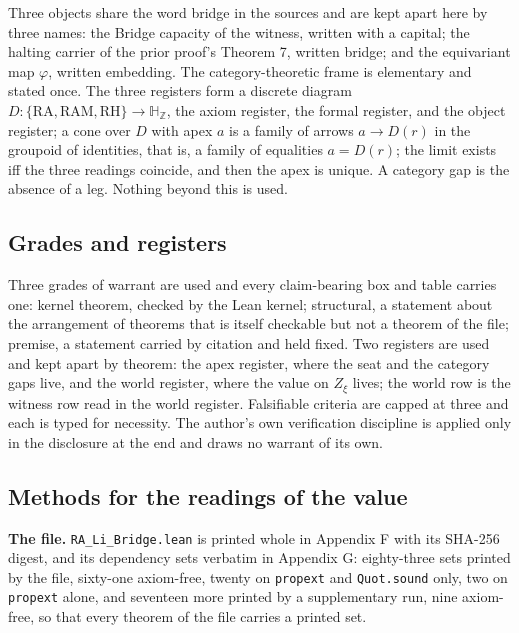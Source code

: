 \documentclass[10pt]{article}
\begin{document}
Three objects share the word bridge in the sources and are kept apart
here by three names: the Bridge capacity of the witness, written with a
capital; the halting carrier of the prior proof's Theorem 7, written
bridge; and the equivariant map \(\varphi\), written embedding. The
category-theoretic frame is elementary and stated once. The three
registers form a discrete diagram
\(D : \{\mathrm{RA}, \mathrm{RAM}, \mathrm{RH}\} \to \mathbb{H}_{\mathbb{Z}}\),
the axiom register, the formal register, and the object register; a cone
over \(D\) with apex \(a\) is a family of arrows \(a \to D(r)\) in the
groupoid of identities, that is, a family of equalities \(a = D(r)\);
the limit exists iff the three readings coincide, and then the apex is
unique. A category gap is the absence of a leg. Nothing beyond this is
used.

\hypertarget{grades-and-registers}{%
\subsection{Grades and registers}\label{grades-and-registers}}

Three grades of warrant are used and every claim-bearing box and table
carries one: kernel theorem, checked by the Lean kernel; structural, a
statement about the arrangement of theorems that is itself checkable but
not a theorem of the file; premise, a statement carried by citation and
held fixed. Two registers are used and kept apart by theorem: the apex
register, where the seat and the category gaps live, and the world
register, where the value on \(Z_\xi\) lives; the world row is the
witness row read in the world register. Falsifiable criteria are capped
at three and each is typed for necessity. The author's own verification
discipline is applied only in the disclosure at the end and draws no
warrant of its own.

\hypertarget{methods-for-the-readings-of-the-value}{%
\subsection{Methods for the readings of the
value}\label{methods-for-the-readings-of-the-value}}

\textbf{The file.} \texttt{RA\_Li\_Bridge.lean} is printed whole in
Appendix F with its SHA-256 digest, and its dependency sets verbatim in
Appendix G: eighty-three sets printed by the file, sixty-one axiom-free,
twenty on \texttt{propext} and \texttt{Quot.sound} only, two on
\texttt{propext} alone, and seventeen more printed by a supplementary
run, nine axiom-free, so that every theorem of the file carries a
printed set.
\end{document}
